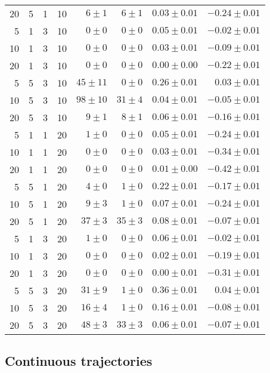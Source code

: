 \documentclass{article}
\begin{document}
\begin{table}
\begin{center}
\begin{tabular}{r r r r r r r r}
20 & 5 & 1 & 10 & $6 \pm 1$ & $6 \pm 1$ & $0.03 \pm 0.01$ & $-0.24 \pm 0.01$ \\
5 & 1 & 3 & 10 & $0 \pm 0$ & $0 \pm 0$ & $0.05 \pm 0.01$ & $-0.02 \pm 0.01$ \\
10 & 1 & 3 & 10 & $0 \pm 0$ & $0 \pm 0$ & $0.03 \pm 0.01$ & $-0.09 \pm 0.01$ \\
20 & 1 & 3 & 10 & $0 \pm 0$ & $0 \pm 0$ & $0.00 \pm 0.00$ & $-0.22 \pm 0.01$ \\
5 & 5 & 3 & 10 & $45 \pm 11$ & $0 \pm 0$ & $0.26 \pm 0.01$ & $0.03 \pm 0.01$ \\
10 & 5 & 3 & 10 & $98 \pm 10$ & $31 \pm 4$ & $0.04 \pm 0.01$ & $-0.05 \pm 0.01$ \\
20 & 5 & 3 & 10 & $9 \pm 1$ & $8 \pm 1$ & $0.06 \pm 0.01$ & $-0.16 \pm 0.01$ \\
5 & 1 & 1 & 20 & $1 \pm 0$ & $0 \pm 0$ & $0.05 \pm 0.01$ & $-0.24 \pm 0.01$ \\
10 & 1 & 1 & 20 & $0 \pm 0$ & $0 \pm 0$ & $0.03 \pm 0.01$ & $-0.34 \pm 0.01$ \\
20 & 1 & 1 & 20 & $0 \pm 0$ & $0 \pm 0$ & $0.01 \pm 0.00$ & $-0.42 \pm 0.01$ \\
5 & 5 & 1 & 20 & $4 \pm 0$ & $1 \pm 0$ & $0.22 \pm 0.01$ & $-0.17 \pm 0.01$ \\
10 & 5 & 1 & 20 & $9 \pm 3$ & $1 \pm 0$ & $0.07 \pm 0.01$ & $-0.24 \pm 0.01$ \\
20 & 5 & 1 & 20 & $37 \pm 3$ & $35 \pm 3$ & $0.08 \pm 0.01$ & $-0.07 \pm 0.01$ \\
5 & 1 & 3 & 20 & $1 \pm 0$ & $0 \pm 0$ & $0.06 \pm 0.01$ & $-0.02 \pm 0.01$ \\
10 & 1 & 3 & 20 & $0 \pm 0$ & $0 \pm 0$ & $0.02 \pm 0.01$ & $-0.19 \pm 0.01$ \\
20 & 1 & 3 & 20 & $0 \pm 0$ & $0 \pm 0$ & $0.00 \pm 0.01$ & $-0.31 \pm 0.01$ \\
5 & 5 & 3 & 20 & $31 \pm 9$ & $1 \pm 0$ & $0.36 \pm 0.01$ & $0.04 \pm 0.01$ \\
10 & 5 & 3 & 20 & $16 \pm 4$ & $1 \pm 0$ & $0.16 \pm 0.01$ & $-0.08 \pm 0.01$ \\
20 & 5 & 3 & 20 & $48 \pm 3$ & $33 \pm 3$ & $0.06 \pm 0.01$ & $-0.07 \pm 0.01$ \\
\hline
\end{tabular}
\end{center}
\end{table}

\subsection{Continuous trajectories}
\end{document}
